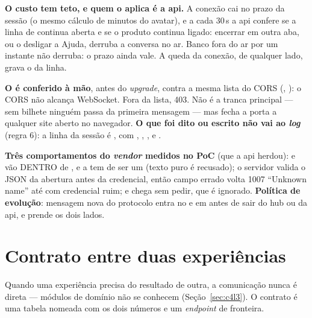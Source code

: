 \begin{regra}
\textbf{O custo tem teto, e quem o aplica é a api.} A conexão cai no prazo da
sessão (o mesmo cálculo de minutos do avatar), e a cada 30\,s a api confere se a
linha de  continua aberta e se o produto continua ligado:
encerrar em outra aba, ou o  desligar a Ajuda, derruba a conversa no
ar. Banco fora do ar por um instante não derruba: o prazo ainda vale. A queda da
conexão, de qualquer lado, grava o  da linha.
\end{regra}

\begin{atencao}
\textbf{O  é conferido à mão}, antes do \emph{upgrade}, contra a mesma
lista do CORS (, ): o CORS não
alcança WebSocket. Fora da lista, 403. Não é a tranca principal --- sem bilhete
ninguém passa da primeira mensagem --- mas fecha a porta a qualquer site aberto no
navegador. \textbf{O que foi dito ou escrito não vai ao \emph{log}} (regra 6): a
linha da sessão é , com , , ,
 e .
\end{atencao}

\textbf{Três comportamentos do \emph{vendor} medidos no PoC} (que a api herdou):
 e  vão DENTRO de
, e a  tem de ser um 
(texto puro é recusado); o servidor valida o JSON da abertura antes da
credencial, então campo errado volta 1007 \enquote{Unknown name} até com
credencial ruim; e chega  sem pedir, que é
ignorado. \textbf{Política de evolução}: mensagem nova do protocolo entra no
 e em  antes de sair do hub ou da
api, e  prende os dois lados.

\section{Contrato entre duas experiências}

Quando uma experiência precisa do resultado de outra, a comunicação nunca é
direta --- módulos de domínio não se conhecem (Seção~\ref{sec:c4l3}). O contrato
é uma tabela nomeada com os dois números e um \emph{endpoint} de fronteira.

